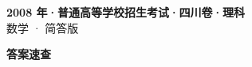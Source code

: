 \documentclass[zihao=-4, a4paper]{ctexart}
\begin{document}
\begin{center}
  {\Large\bfseries 2008 年·普通高等学校招生考试·四川卷·理科}\\[4pt]
  {\large 数学 · 简答版}
\end{center}
\medskip
{}

\clearpage
{}
\begin{center}{\Large\bfseries 答案速查}\end{center}
\medskip

\end{document}

